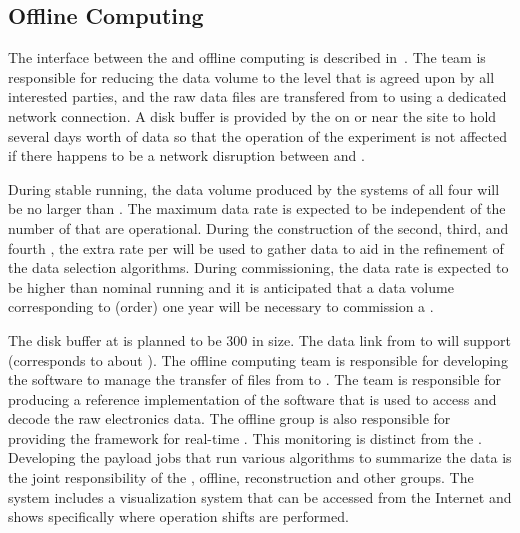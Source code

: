 \subsection{Offline Computing} %
\label{sec:fd-daq-intfc-fnal-cmptg}

The interface between the  and offline computing is
described in~\cite{docdb-7123}.
The  team is responsible for reducing the data volume
to the level that is agreed upon by all interested parties, and the
raw data files are transfered from \surf to \fnal using a
dedicated network connection.
A disk buffer is provided by the  on or near the \surf
site to hold %
several days worth of data %
so that the
operation of the experiment is not %
affected if there happens to
be a network disruption between \surf and \fnal.

During stable running, the data volume produced by the
 systems of all four  will be no larger
than \offsitepbpy.
The maximum data rate is expected to be independent of the number of
 that are operational.
During the construction of the second, third, and fourth
, the extra rate per  will be used
to gather data to aid in the refinement of the data selection
algorithms.
During commissioning, the data rate is expected to be higher than
nominal running and it is anticipated that  %
a data volume corresponding to (order) one year will be necessary to commission a .

The disk buffer at \surf is planned to be \SI{300}{\TB} in size.
The data link from \surf to \fnal will support \surffnalbw
(\offsitepbpy corresponds to about \offsitegbps).
The offline computing team is responsible for developing the
software to manage the transfer of files from \surf to \fnal.
The  team is responsible for producing a reference
implementation of the software that is used to access and decode the
raw electronics data.
The offline group is also responsible for providing the framework
for real-time . 
This monitoring is distinct from the .
Developing the payload jobs that run various algorithms to
summarize the data is the joint responsibility of the , offline,
reconstruction and other groups.
The  system includes a visualization system that can be
accessed from the Internet and shows specifically where operation shifts are
performed.

